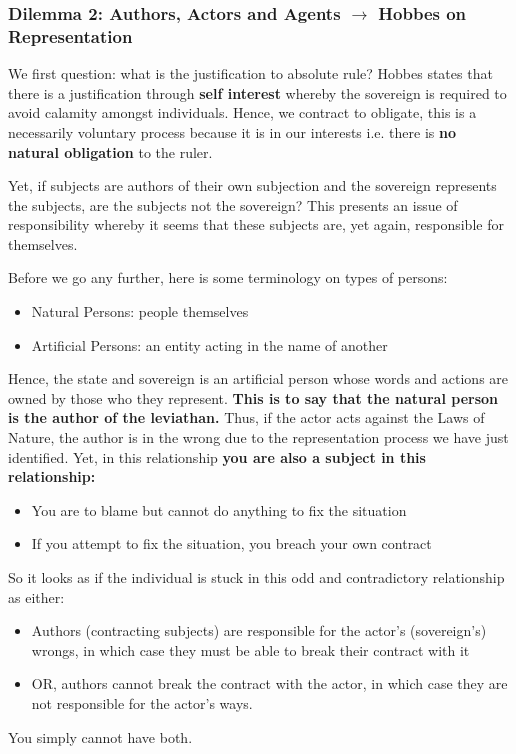 \documentclass[12pt, letterpaper]{article}
\begin{document}
\subsubsection{Dilemma 2: Authors, Actors and Agents $\rightarrow$  Hobbes on Representation}
We first question: what is the justification to absolute rule? Hobbes states that there is a justification through \textbf{self interest} whereby the sovereign is required to avoid calamity amongst individuals. Hence, we contract to obligate, this is a necessarily voluntary process because it is in our interests i.e. there is \textbf{no natural obligation} to the ruler.

Yet, if subjects are authors of their own subjection and the sovereign represents the subjects, are the subjects not the sovereign? This presents an issue of responsibility whereby it seems that these subjects are, yet again, responsible for themselves.

Before we go any further, here is some terminology on types of persons:
\begin{itemize}
	\item Natural Persons: people themselves
	\item Artificial Persons: an entity acting in the name of another
\end{itemize}
Hence, the state and sovereign is an artificial person whose words and actions are owned by those who they represent. \textbf{This is to say that the natural person is the author of the leviathan.} Thus, if the actor acts against the Laws of Nature, the author is in the wrong due to the representation process we have just identified. Yet, in this relationship \textbf{you are also a subject in this relationship:}
\begin{itemize}
	\item You are to blame but cannot do anything to fix the situation
	\item If you attempt to fix the situation, you breach your own contract
\end{itemize}
So it looks as if the individual is stuck in this odd and contradictory relationship as either:
\begin{itemize}
	\item Authors (contracting subjects) are responsible for the actor's (sovereign's) wrongs, in which case they must be able to break their contract with it
	\item OR, authors cannot break the contract with the actor, in which case they are not responsible for the actor's ways.
\end{itemize}
You simply cannot have both.
\end{document}
